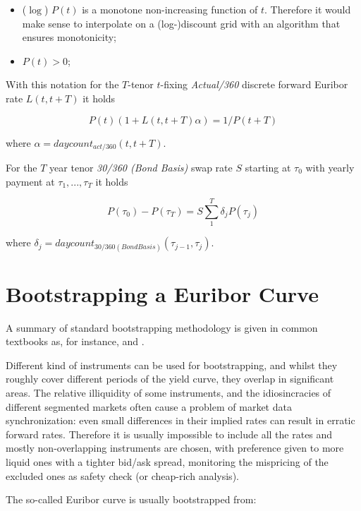 \documentclass[11pt,reqno]{amsart}
\begin{document}
\begin{itemize}
\item ($\log $) $P(t) $ is a monotone non-increasing function of 
$t$. Therefore it would make sense to interpolate on a (log-)discount grid
with an algorithm that ensures monotonicity;

\item $P\left( t\right) >0$;
\end{itemize}

With this notation for the $T$-tenor $t$-fixing {\it Actual/360} discrete
forward Euribor rate $L(t, t+T)$ it holds

\begin{equation}
P(t) (1 + L(t, t+T) \alpha) = 1/P(t+T)
\label{eqn:Euriborrate}
\end{equation}

where $\alpha = daycount_{act/360}(t,t+T)$.

For the $T$ year tenor {\it 30/360 (Bond Basis)}
swap rate $S$ starting at $\tau_0$ with yearly payment at $\tau_1, ..., \tau_T$ it
holds

\begin{equation}
P(\tau_0)-P(\tau_T) = S \sum_1^T \delta_j P(\tau_j)
\label{eqn:swaprate}
\end{equation}

where $\delta_j = daycount_{30/360 (Bond Basis)}(\tau_{j-1}, \tau_j)$.

\section{Bootstrapping a Euribor Curve}

A summary of standard bootstrapping methodology is given in common textbooks
as, for instance, \cite{Hull} and \cite{Rebonato}.

Different kind of instruments can be used for bootstrapping, and whilst they
roughly cover different periods of the yield curve, they overlap in
significant areas. The relative illiquidity of some instruments, and the
idiosincracies of different segmented markets often cause a problem of
market data synchronization: even small differences in their implied rates
can result in erratic forward rates. Therefore it is usually impossible to
include all the rates and mostly non-overlapping instruments are chosen,
with preference given to more liquid ones with a tighter bid/ask spread,
monitoring the mispricing of the excluded ones as safety check (or
cheap-rich analysis).

The so-called Euribor curve is usually bootstrapped from:
\end{document}
